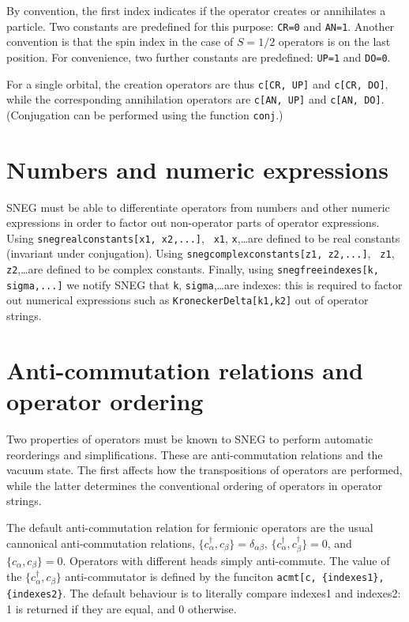 \documentclass[a4paper,10pt,openany]{book}
\begin{document}
By convention, the first index indicates if the operator creates or
annihilates a particle. Two constants are predefined for this purpose:
{\tt CR=0} and {\tt AN=1}. Another convention is that the spin index
in the case of $S=1/2$ operators is on the last position. For convenience,
two further constants are predefined: {\tt UP=1} and {\tt DO=0}.

For a single orbital, the creation operators are thus {\tt c[CR, UP]}
and {\tt c[CR, DO]}, while the corresponding annihilation operators
are {\tt c[AN, UP]} and {\tt c[AN, DO]}. (Conjugation can be performed
using the function {\tt conj}.)


\section{Numbers and numeric expressions}

SNEG must be able to differentiate operators from numbers and other
numeric expressions in order to factor out non-operator parts of
operator expressions. Using {\tt snegrealconstants[x1, x2,...]}, {\tt
  x1}, {\tt x},\ldots are defined to be real constants (invariant
under conjugation). Using {\tt snegcomplexconstants[z1, z2,...]}, {\tt
  z1}, {\tt z2},\ldots are defined to be complex constants.  Finally,
using {\tt snegfreeindexes[k, sigma,...]} we notify SNEG that {\tt k},
{\tt sigma},\ldots are indexes: this is required to factor out numerical
expressions such as {\tt KroneckerDelta[k1,k2]} out of operator strings.


\section{Anti-commutation relations and operator ordering}
\label{acmt}

Two properties of operators must be known to SNEG to perform automatic
reorderings and simplifications. These are anti-commutation relations
and the vacuum state. The first affects how the transpositions of
operators are performed, while the latter determines the conventional
ordering of operators in operator strings. 

The default anti-commutation relation for fermionic operators are the
usual cannonical anti-commutation relations,
$\{c^\dag_\alpha,c_\beta\} = \delta_{\alpha\beta}$,
$\{c^\dag_\alpha,c^\dag_\beta\} = 0$, and $\{c_\alpha,c_\beta\} = 0$.
Operators with different heads simply anti-commute. The value of the
$\{c^\dag_\alpha,c_\beta\}$ anti-commutator is defined by the funciton
{\tt acmt[c, \{indexes1\}, \{indexes2\}}. The default behaviour is to
literally compare indexes1 and indexes2: 1 is returned if they are equal,
and 0 otherwise. 
\end{document}
